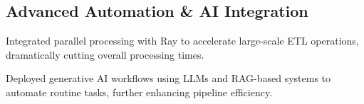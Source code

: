 \subsection{{Advanced Automation \& AI Integration}}
\begin{zitemize}
\item Integrated parallel processing with Ray to accelerate large-scale ETL operations, dramatically cutting overall processing times.
\item Deployed generative AI workflows using LLMs and RAG-based systems to automate routine tasks, further enhancing pipeline efficiency.
\end{zitemize}

